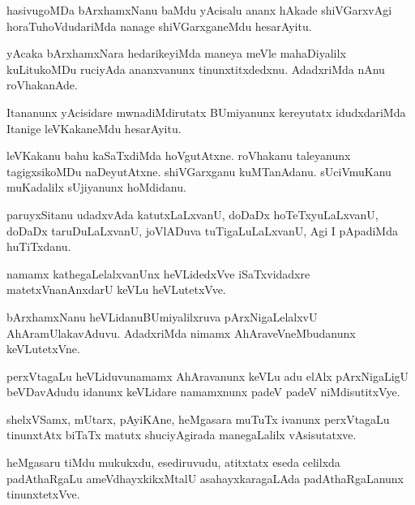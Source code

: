 \begin{mng}
hasivugoMDa bArxhamxNanu baMdu yAcisalu ananx hAkade shiVGarxvAgi horaTuhoVdudariMda nanage shiVGarxganeMdu hesarAyitu.
\end{mng}

\begin{mng}
yAcaka bArxhamxNara hedarikeyiMda maneya meVle mahaDiyalilx kuLitukoMDu ruciyAda ananxvanunx tinunxtitxdedxnu. AdadxriMda nAnu roVhakanAde.
\end{mng}

\begin{mng}
Itananunx yAcisidare mwnadiMdirutatx BUmiyanunx kereyutatx idudxdariMda Itanige leVKakaneMdu hesarAyitu.
\end{mng}

\begin{mng}
leVKakanu bahu kaSaTxdiMda hoVgutAtxne. roVhakanu taleyanunx tagigxsikoMDu naDeyutAtxne. shiVGarxganu kuMTanAdanu. sUciVmuKanu muKadalilx sUjiyanunx hoMdidanu.
\end{mng}

\begin{mng}
paruyxSitanu udadxvAda katutxLaLxvanU, doDaDx hoTeTxyuLaLxvanU, doDaDx taruDuLaLxvanU, joVlADuva tuTigaLuLaLxvanU, Agi I pApadiMda huTiTxdanu.
\end{mng}

\begin{mng}
namamx kathegaLelalxvanUnx heVLidedxVve iSaTxvidadxre matetxVnanAnxdarU keVLu heVLutetxVve.
\end{mng}

\begin{mng}
bArxhamxNanu heVLidanu\mdash BUmiyalilxruva pArxNigaLelalxvU AhAramUlakavAduvu. AdadxriMda nimamx AhAraveVneMbudanunx keVLutetxVne.
\end{mng}

\begin{mng}
perxVtagaLu heVLiduvu\mdash namamx AhAravanunx keVLu adu elAlx pArxNigaLigU beVDavAdudu idanunx keVLidare namamxnunx padeV padeV niMdisutitxVye.
\end{mng}

\begin{mng}
shelxVSamx, mUtarx, pAyiKAne, heMgasara muTuTx ivanunx perxVtagaLu tinunxtAtx biTaTx matutx shuciyAgirada manegaLalilx vAsisutatxve.
\end{mng}

\begin{mng}
heMgasaru tiMdu mukukxdu, esediruvudu, atitxtatx eseda celilxda padAthaRgaLu ameVdhayxkikxMtalU asahayxkaragaLAda padAthaRgaLanunx tinunxtetxVve.
\end{mng}

